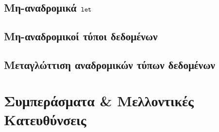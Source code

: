 \documentclass[diploma]{softlab-thesis}
\begin{document}


\section{Μη-αναδρομικά $\operatorname{\texttt{let}}$}



\section{Μη-αναδρομικοί τύποι δεδομένων}
\label{sec:non-recursive-data}


\section{Μεταγλώττιση αναδρομικών τύπων δεδομένων}
\label{sec:compile-recursive-datatypes}



\chapter{Συμπεράσματα \& Μελλοντικές Κατευθύνσεις}
\label{chap:chapter6}


\nocite{*}






\backmatter

\appendix




\end{document}
